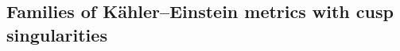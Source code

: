 \documentclass[a4paper, 11pt]{amsart}
\theoremstyle{plain}
\numberwithin{equation}{section} %
\numberwithin{figure}{section} %
\theoremstyle{plain}
\theoremstyle{plain}
\theoremstyle{plain}
\theoremstyle{plain}
\theoremstyle{remark}
\theoremstyle{definition}
\theoremstyle{definition}
\DeclareMathOperator \Ric {\textrm{Ric}}
\begin{document}
\subsection{Families of K\"ahler--Einstein metrics with  cusp singularities}

\end{document}
